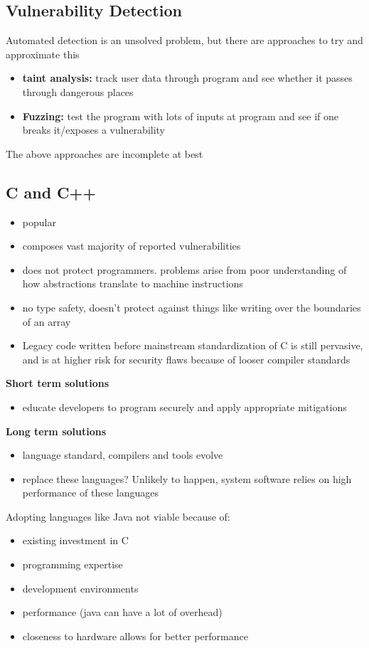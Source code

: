 \documentclass{article}
\begin{document}
\subsection{Vulnerability Detection}
Automated detection is an unsolved problem, but there are approaches to try and approximate this
\begin{itemize}
    \item \textbf{taint analysis:} track user data through program and see whether it passes through dangerous places
    \item \textbf{Fuzzing:} test the program with lots of inputs at program and see if one breaks it/exposes a vulnerability
\end{itemize}
The above approaches are incomplete at best
\subsection{C and C++}
\begin{itemize}
    \item popular
    \item composes vast majority of reported vulnerabilities
    \item does not protect programmers. problems arise from poor understanding of how abstractions translate to machine instructions
    \item no type safety, doesn't protect against things like writing over the boundaries of an array
    \item Legacy code written before mainstream standardization of C is still pervasive, and is at higher risk for security flaws because of looser compiler standards
\end{itemize}
\textbf{Short term solutions}
\begin{itemize}
    \item educate developers to program securely and apply appropriate mitigations
\end{itemize}
\textbf{Long term solutions}
\begin{itemize}
    \item language standard, compilers and tools evolve
    \item replace these languages? Unlikely to happen, system software relies on high performance of these languages
\end{itemize}
Adopting languages like Java not viable because of:
\begin{itemize}
    \item existing investment in C
    \item programming expertise
    \item development environments
    \item performance (java can have a lot of overhead)
    \item closeness to hardware allows for better performance
\end{itemize}
\end{document}
